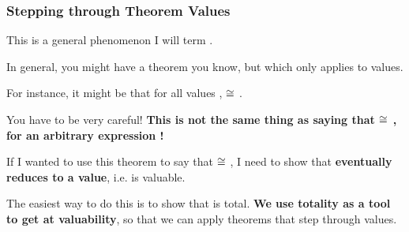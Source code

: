 \documentclass[aspectratio=169]{beamer}
\begin{document}
\begin{frame}[fragile]
  \frametitle{Stepping through Theorem Values}

  This is a general phenomenon I will term .
  
  \pause
  \vspace{\fill}

  In general, you might have a theorem you know, but which only applies to values.

  \vspace{\fill}

  For instance, it might be that for all values ,  $\cong$ 
  .

  \pause
  \vspace{\fill}

  You have to be very careful! \textbf{This is not the same thing as saying that
   $\cong$ , for an arbitrary expression !}\footnotemark

  \pause
  \vspace{\fill}

  If I wanted to use this theorem to say that  $\cong$ ,
  I need to show that  \textbf{eventually reduces to a value}, i.e. is valuable.

  \pause
  \vspace{\fill}

  The easiest way to do this is to show that  is total. \textbf{We use totality as
  a tool to get at valuability}, so that we can apply theorems that step through values.

\end{frame}
\end{document}
